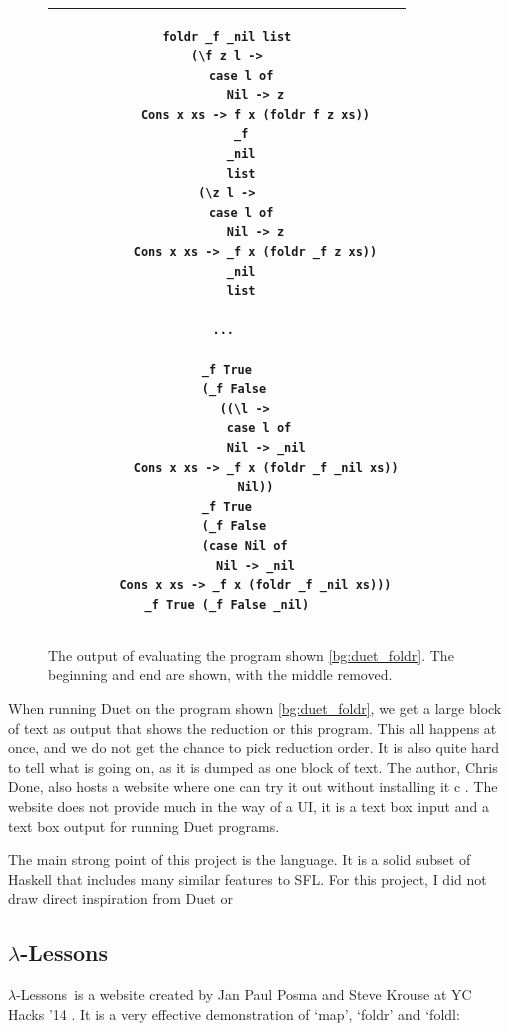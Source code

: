 \begin{figure}[h]
    \centering
    \begin{tabular}{c}
    \hline
    \begin{lstlisting}[language=SFL_noprelude_numbers]
foldr _f _nil list
(\f z l ->
    case l of
        Nil -> z
        Cons x xs -> f x (foldr f z xs))
    _f
    _nil
    list
(\z l ->
    case l of
        Nil -> z
        Cons x xs -> _f x (foldr _f z xs))
    _nil
    list

... 

_f True
  (_f False
     ((\l ->
         case l of
           Nil -> _nil
           Cons x xs -> _f x (foldr _f _nil xs))
        Nil))
_f True
  (_f False
     (case Nil of
        Nil -> _nil
        Cons x xs -> _f x (foldr _f _nil xs)))
_f True (_f False _nil)
\end{lstlisting}\\ \hline

    \end{tabular}
    \caption{The output of evaluating the program shown \ref{bg:duet_foldr}. The beginning and end are shown, with the middle removed. }
    \label{bg:duet_foldr_eval}
\end{figure}

\noindent When running Duet \cite{duet_hackage} on the program shown \ref{bg:duet_foldr}, we get a large block of text as output that shows the reduction or this program. This all happens at once, and we do not get the chance to pick reduction order. It is also quite hard to tell what is going on, as it is dumped as one block of text. The author, Chris Done, also hosts a website where one can try it out without installing it c \cite{duet_delta}. The website does not provide much in the way of a UI, it is a text box input and a text box output for running Duet programs.

The main strong point of this project is the language. It is a solid subset of Haskell that includes many similar features to SFL. For this project, I did not draw direct inspiration from Duet or 

\subsection{$\lambda$-Lessons}
\newcommand{\llessons}{$\lambda$-Lessons}

\llessons\ is a website created by Jan Paul Posma and Steve Krouse at YC Hacks '14 \cite{lambdalessons}. It is a very effective demonstration of `map', `foldr' and `foldl:

